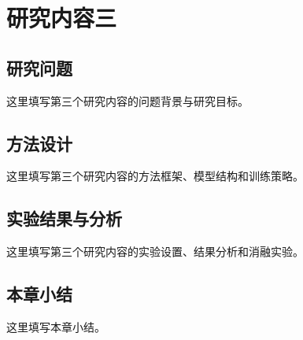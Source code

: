 \chapter{研究内容三}

\section{研究问题}

这里填写第三个研究内容的问题背景与研究目标。

\section{方法设计}

这里填写第三个研究内容的方法框架、模型结构和训练策略。

\section{实验结果与分析}

这里填写第三个研究内容的实验设置、结果分析和消融实验。

\section{本章小结}

这里填写本章小结。
